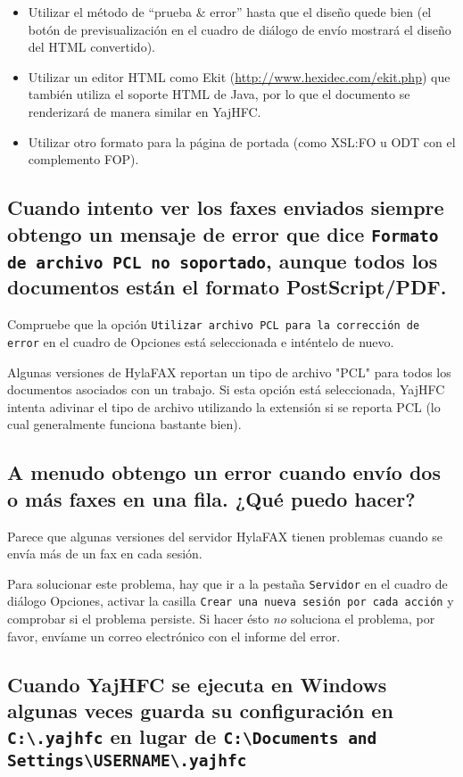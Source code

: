 \documentclass[a4paper,10pt]{scrartcl}
\begin{document}
\begin{itemize}
 \item Utilizar el método de ``prueba \& error'' hasta que el diseño quede bien (el botón de previsualización en el cuadro de diálogo de envío mostrará el diseño del HTML convertido).
 \item Utilizar un editor HTML como Ekit (\url{http://www.hexidec.com/ekit.php}) que también utiliza el soporte HTML de Java, por lo que el documento se renderizará de manera similar en YajHFC.
 \item Utilizar otro formato para la página de portada (como XSL:FO u ODT con el complemento FOP).
\end{itemize}

\subsection{Cuando intento ver los faxes enviados siempre obtengo un mensaje de error 
   que dice \texttt{Formato de archivo PCL no soportado}, aunque todos los documentos 
   están el formato PostScript/PDF.}

Compruebe que la opción \texttt{Utilizar archivo PCL para la corrección de error} en el 
cuadro de Opciones está seleccionada e inténtelo de nuevo.
 
Algunas versiones de HylaFAX reportan 
un tipo de archivo "PCL" para todos los documentos asociados con un trabajo. 
Si esta opción está seleccionada, YajHFC intenta adivinar el tipo de archivo 
utilizando la extensión si se reporta PCL (lo cual generalmente funciona bastante bien).

\subsection{A menudo obtengo un error cuando envío dos o más faxes en una fila. ¿Qué puedo hacer?}

Parece que algunas versiones del servidor HylaFAX tienen problemas cuando se envía más de un fax en cada sesión.

Para solucionar este problema, hay que ir a la pestaña \texttt{Servidor} en el cuadro de diálogo Opciones, activar la casilla \texttt{Crear una nueva sesión por cada acción} y comprobar si el problema persiste.
Si hacer ésto \emph{no} soluciona el problema, por favor, envíame un correo electrónico con el informe del error.

\subsection{Cuando YajHFC se ejecuta en Windows algunas veces guarda su configuración en \texttt{C:\textbackslash .yajhfc} en lugar de \texttt{C:\textbackslash Documents and Settings\textbackslash USERNAME\textbackslash .yajhfc}}
\end{document}
